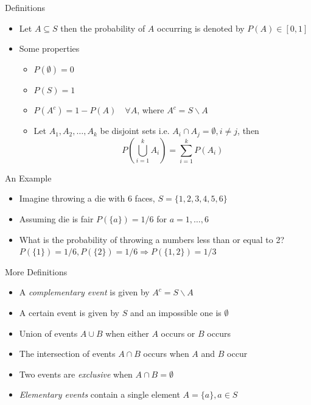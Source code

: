 \documentclass{beamer}
\begin{document}
\begin{frame}{Definitions}
\begin{itemize}
 \item Let $A \subseteq S$ then the probability of $A$ occurring is denoted by $P(A) \in [0, 1]$
 \item Some properties 
 \begin{itemize}
 \item $P(\emptyset) = 0$
 \item $P(S) = 1$
 \item $P(A^c) = 1 - P(A) \quad \forall A$,  where $A^c = S \backslash A$
 \item Let $A_1, A_2, \ldots, A_k$ be disjoint sets i.e. $A_i \cap A_j = \emptyset, i \neq j$, then 
 \begin{displaymath} 
  P\left(\bigcup_{i=1}^k A_i \right) = \sum_{i=1}^k P(A_i)
 \end{displaymath}
 \end{itemize} 
\end{itemize}
\end{frame}

\begin{frame}{An Example} 
\begin{itemize} 
 \item Imagine throwing a die with 6 faces, $S = \{1,2,3,4,5,6\}$
\item Assuming die is fair $P(\{a\}) = 1/6$ for $a = 1, \ldots, 6$
\item What is the probability of throwing a numbers less than or equal to 2? $P(\{1\}) = 1/6, P(\{2\}) = 1/6 \Rightarrow P(\{1, 2\}) = 1/3$
\end{itemize}
\end{frame}

\begin{frame}{More Definitions}  
\begin{itemize}
 \item A \emph{complementary event} is given by $A^c = S \backslash A$ 
\item A certain event is given by $S$ and an impossible one is $\emptyset$
\item Union of events $A \cup B$ when either $A$ occurs or $B$ occurs
\item The intersection of events $A \cap B$ occurs when $A$  and $B$ occur
\item Two events are \emph{exclusive} when $A \cap B = \emptyset$ 
\item \emph{Elementary events} contain a single element $A = \{a\}, a \in S$ 
\end{itemize} 
\end{frame}
\end{document}
